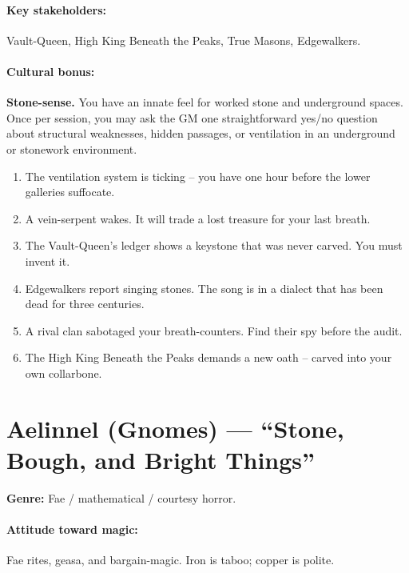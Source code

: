 \paragraph{Key stakeholders:} Vault-Queen, High King Beneath the Peaks, True Masons, Edgewalkers.

\paragraph{Cultural bonus:} \textbf{Stone-sense.} You have an innate feel for worked stone and underground spaces. Once per session, you may ask the GM one straightforward yes/no question about structural weaknesses, hidden passages, or ventilation in an underground or stonework environment.

\begin{tcolorbox}[colback=gray!5!white, colframe=gray!70!black, title=Aeler Mini-Generator (d6),breakable]
\begin{enumerate}
\item The ventilation system is ticking -- you have one hour before the lower galleries suffocate.
\item A vein-serpent wakes. It will trade a lost treasure for your last breath.
\item The Vault-Queen's ledger shows a keystone that was never carved. You must invent it.
\item Edgewalkers report singing stones. The song is in a dialect that has been dead for three centuries.
\item A rival clan sabotaged your breath-counters. Find their spy before the audit.
\item The High King Beneath the Peaks demands a new oath -- carved into your own collarbone.
\end{enumerate}
\end{tcolorbox}

\section{Aelinnel (Gnomes) --- ``Stone, Bough, and Bright Things''}
\textbf{Genre:} Fae / mathematical / courtesy horror.

\paragraph{Attitude toward magic:} Fae rites, geasa, and bargain-magic. Iron is taboo; copper is polite.

